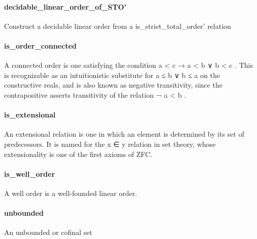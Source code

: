 \documentclass{article}
\begin{document}
\paragraph{decidable\_linear\_order\_of\_STO'}
\par
Construct a decidable linear order from a 
\colorbox[RGB]{253,246,227}{{{{\color[RGB]{101, 123, 131} is\_strict\_total\_order' }}}} relation
\paragraph{is\_order\_connected}
\par
A connected order is one satisfying the condition 
\colorbox[RGB]{253,246,227}{{{{\color[RGB]{101, 123, 131} a  }}}{{{\color[RGB]{181, 137, 0} < }}}{{{\color[RGB]{101, 123, 131}  c  }}}{{{\color[RGB]{133, 153, 0} → }}}{{{\color[RGB]{101, 123, 131}  a  }}}{{{\color[RGB]{181, 137, 0} < }}}{{{\color[RGB]{101, 123, 131}  b  }}}{{{\color[RGB]{181, 137, 0} ∨ }}}{{{\color[RGB]{101, 123, 131}  b  }}}{{{\color[RGB]{181, 137, 0} < }}}{{{\color[RGB]{101, 123, 131}  c }}}}.
This is recognizable as an intuitionistic substitute for 
\colorbox[RGB]{253,246,227}{{{{\color[RGB]{101, 123, 131} a  }}}{{{\color[RGB]{181, 137, 0} ≤ }}}{{{\color[RGB]{101, 123, 131}  b  }}}{{{\color[RGB]{181, 137, 0} ∨ }}}{{{\color[RGB]{101, 123, 131}  b  }}}{{{\color[RGB]{181, 137, 0} ≤ }}}{{{\color[RGB]{101, 123, 131}  a }}}} on
the constructive reals, and is also known as negative transitivity,
since the contrapositive asserts transitivity of the relation 
\colorbox[RGB]{253,246,227}{{{{\color[RGB]{181, 137, 0} ¬ }}}{{{\color[RGB]{101, 123, 131}  a  }}}{{{\color[RGB]{181, 137, 0} < }}}{{{\color[RGB]{101, 123, 131}  b }}}}.
\paragraph{is\_extensional}
\par
An extensional relation is one in which an element is determined by its set
of predecessors. It is named for the 
\colorbox[RGB]{253,246,227}{{{{\color[RGB]{101, 123, 131} x ∈ y }}}} relation in set theory, whose
extensionality is one of the first axioms of ZFC.
\paragraph{is\_well\_order}
\par
A well order is a well-founded linear order.
\paragraph{unbounded}
\par
An unbounded or cofinal set
\end{document}
